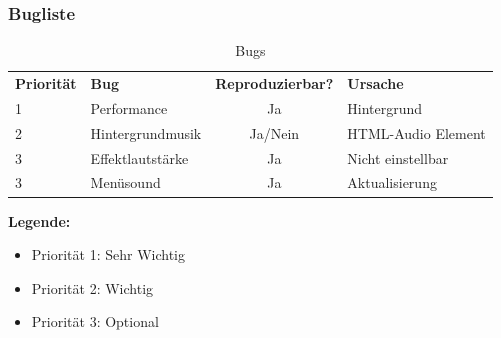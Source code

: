 \subsubsection{Bugliste}
\begin{table}[h]
	\centering
	\begin{tabular}{l|l|c|l}
		\textbf{Priorität}& \textbf{Bug} & \textbf{Reproduzierbar?} & \textbf{Ursache}\\
		1 & Performance & Ja & Hintergrund	\\ 
		2 & Hintergrundmusik & Ja/Nein & HTML-Audio Element\\
		3 & Effektlautstärke & Ja & Nicht einstellbar\\
		3 & Menüsound & Ja & Aktualisierung\\
	\end{tabular}
	\caption{Bugs}
\end{table}
\textbf{Legende:}
\begin{itemize}
	\item Priorität 1: Sehr Wichtig
	\item Priorität 2: Wichtig
	\item Priorität 3: Optional
\end{itemize}

